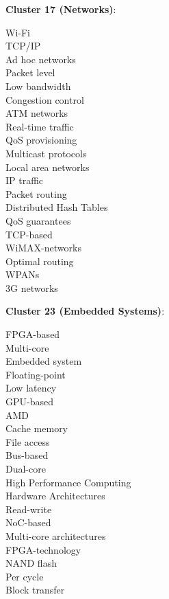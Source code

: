 \documentclass[11pt]{article}
\begin{document}
\textbf{Cluster 17 (Networks)}:
\begin{multicols}{3}
Wi-Fi\\
TCP/IP\\
Ad hoc networks\\
Packet level\\
Low bandwidth\\
Congestion control\\
ATM networks\\
Real-time traffic\\
QoS provisioning\\
Multicast protocols\\
Local area networks\\
IP traffic\\
Packet routing\\
Distributed Hash Tables\\
QoS guarantees\\
TCP-based\\
WiMAX-networks\\
Optimal routing\\
WPANs\\
3G networks
\end{multicols}

\textbf{Cluster 23 (Embedded Systems)}:
\begin{multicols}{3}
FPGA-based\\
Multi-core\\
Embedded system\\
Floating-point\\
Low latency\\
GPU-based\\
AMD\\
Cache memory\\
File access\\
Bus-based\\
Dual-core\\
High Performance Computing\\
Hardware Architectures\\
Read-write\\
NoC-based\\
Multi-core architectures\\
FPGA-technology\\
NAND flash\\
Per cycle\\
Block transfer
\end{multicols}
\end{document}
